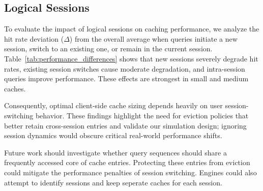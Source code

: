 \subsection{Logical Sessions}
To evaluate the impact of logical sessions on caching performance, 
we analyze the hit rate deviation ($\Delta$) from the overall average when queries initiate a new session, 
switch to an existing one, or remain in the current session.
Table~\ref{tab:performance_differences} shows that new sessions severely degrade hit rates,
existing session switches cause moderate degradation, and intra-session queries improve performance.
These effects are strongest in small and medium caches.

Consequently, optimal client-side cache sizing depends heavily on user session-switching behavior.
These findings highlight the need for eviction policies that better retain cross-session entries
and validate our simulation design;
ignoring session dynamics would obscure critical real-world performance shifts.

Future work should investigate whether query sequences should share a frequently accessed core of cache entries.
Protecting these entries from eviction could mitigate the performance penalties of session switching.
Engines could also attempt to identify sessions and keep seperate caches for each session.

